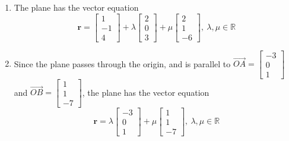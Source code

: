 \documentclass[11pt,a4paper]{book}
\newcommand{\R}{\mathbb{R}}
\begin{document}
\begin{example}
\begin{enumerate}[label=(\alph*)]
\item  The plane has the vector equation
\[
\textbf{r}=\begin{bmatrix}1\\
-1\\
4
\end{bmatrix}+\lambda\begin{bmatrix}2\\
0\\
3
\end{bmatrix}+\mu\begin{bmatrix}2\\
1\\
-6
\end{bmatrix},\:\lambda,\mu\in\R
\]

\item  Since the plane passes through the origin, and is parallel
to $\overrightarrow{OA}=\begin{bmatrix}-3\\
0\\
1
\end{bmatrix}$ and $\overrightarrow{OB}=\begin{bmatrix}1\\
1\\
-7
\end{bmatrix}$, the plane has the vector equation
\[
\textbf{r}=\lambda\begin{bmatrix}-3\\
0\\
1
\end{bmatrix}+\mu\begin{bmatrix}1\\
1\\
-7
\end{bmatrix},\:\lambda,\mu\in\R
\]


\end{enumerate}
\end{example}
\end{document}
